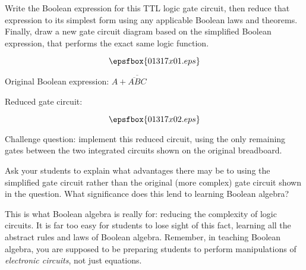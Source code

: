 

Write the Boolean expression for this TTL logic gate circuit, then reduce that expression to its simplest form using any applicable Boolean laws and theorems.  Finally, draw a new gate circuit diagram based on the simplified Boolean expression, that performs the exact same logic function.

$$\epsfbox{01317x01.eps}$$







Original Boolean expression: $A + \overline{\overline{AB}C}$

\vskip 10pt

Reduced gate circuit:

$$\epsfbox{01317x02.eps}$$

\vskip 10pt

Challenge question: implement this reduced circuit, using the only remaining gates between the two integrated circuits shown on the original breadboard.







Ask your students to explain what advantages there may be to using the simplified gate circuit rather than the original (more complex) gate circuit shown in the question.  What significance does this lend to learning Boolean algebra?

This is what Boolean algebra is really for: reducing the complexity of logic circuits.  It is far too easy for students to lose sight of this fact, learning all the abstract rules and laws of Boolean algebra.  Remember, in teaching Boolean algebra, you are supposed to be preparing students to perform manipulations of {\it electronic circuits}, not just equations.




